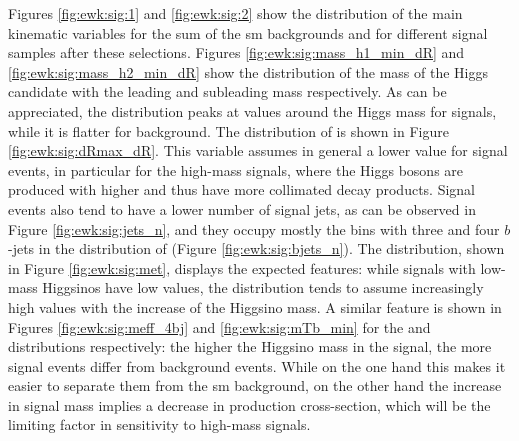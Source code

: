 Figures \ref{fig:ewk:sig:1} and \ref{fig:ewk:sig:2}  show the distribution of the main kinematic variables for 
the sum of the \gls{sm} backgrounds and for different signal samples after these selections.
Figures \ref{fig:ewk:sig:mass_h1_min_dR} and \ref{fig:ewk:sig:mass_h2_min_dR} show the distribution of the mass of the Higgs 
candidate with the leading and subleading mass respectively. As can be appreciated, the distribution peaks at values around the Higgs mass for 
signals, while it is flatter for background. 
The distribution of \dRmax is shown in Figure \ref{fig:ewk:sig:dRmax_dR}. This variable assumes in general a lower value for 
signal events, in particular for the high-mass signals, where the Higgs bosons are produced with higher \pt and thus have 
more collimated decay products. Signal events also tend to have a lower number of signal jets, as can be observed in Figure 
\ref{fig:ewk:sig:jets_n}, and they occupy mostly the bins with three and four $b$-jets in the 
distribution of \nbjet (Figure \ref{fig:ewk:sig:bjets_n}). 
The \met distribution, shown in Figure \ref{fig:ewk:sig:met}, displays the expected features: while signals with low-mass Higgsinos 
have low \met values, the distribution tends to assume increasingly high values with the increase of the Higgsino mass. 
A similar feature is shown in Figures \ref{fig:ewk:sig:meff_4bj} and \ref{fig:ewk:sig:mTb_min} for the \meffb and \mtb distributions respectively: 
the higher the Higgsino mass in the signal, the more signal events differ from background events. 
While on the one hand this makes it easier to separate them from the \gls{sm} background, on the other hand the increase in signal mass 
implies a decrease in production cross-section, which will be the limiting factor in sensitivity to high-mass signals. 

